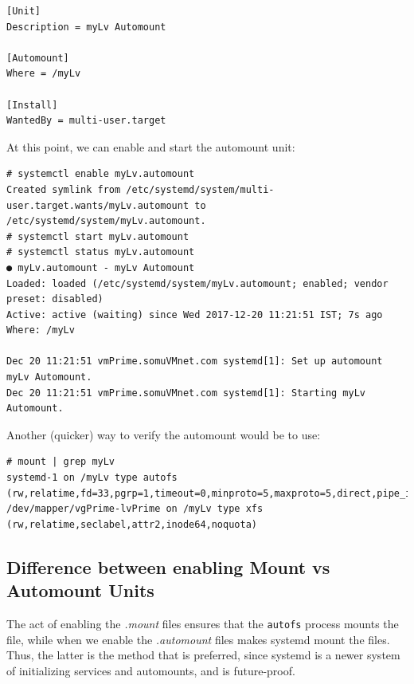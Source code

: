 \vspace{-15pt}
\begin{verbatim}
[Unit]
Description = myLv Automount

[Automount]
Where = /myLv

[Install]
WantedBy = multi-user.target
\end{verbatim}
\vspace{-10pt}

\noindent
At this point, we can enable and start the automount unit:

\vspace{-15pt}
\begin{verbatim}
# systemctl enable myLv.automount 
Created symlink from /etc/systemd/system/multi-user.target.wants/myLv.automount to /etc/systemd/system/myLv.automount.
# systemctl start myLv.automount 
# systemctl status myLv.automount 
● myLv.automount - myLv Automount
Loaded: loaded (/etc/systemd/system/myLv.automount; enabled; vendor preset: disabled)
Active: active (waiting) since Wed 2017-12-20 11:21:51 IST; 7s ago
Where: /myLv

Dec 20 11:21:51 vmPrime.somuVMnet.com systemd[1]: Set up automount myLv Automount.
Dec 20 11:21:51 vmPrime.somuVMnet.com systemd[1]: Starting myLv Automount.
\end{verbatim}
\vspace{-10pt}

\noindent
Another (quicker) way to verify the automount would be to use:

\vspace{-15pt}
\begin{verbatim}
# mount | grep myLv
systemd-1 on /myLv type autofs (rw,relatime,fd=33,pgrp=1,timeout=0,minproto=5,maxproto=5,direct,pipe_ino=13344)
/dev/mapper/vgPrime-lvPrime on /myLv type xfs (rw,relatime,seclabel,attr2,inode64,noquota)
\end{verbatim}
\vspace{-10pt}

\subsection{Difference between enabling Mount vs Automount Units}
The act of enabling the \textit{.mount} files ensures that the \verb|autofs| process mounts the file, while when we enable the \textit{.automount} files makes systemd mount the files. Thus, the latter is the method that is preferred, since systemd is a newer system of initializing services and automounts, and is future-proof. 
